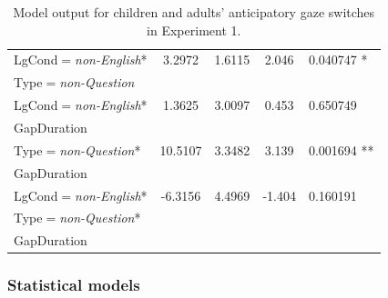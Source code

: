 \documentclass[authoryear, 12pt]{elsarticle}
\begin{document}
\begin{table}[h!]
\begin{small}
\begin{center}
\begin{tabular}{lcccl}
    LgCond$=$\textit{non-English}*			& 3.2972			& 1.6115		& 2.046	& 0.040747 * 	\\ 
    \hspace*{5mm} Type$=$\textit{non-Question} &&&& \\
    LgCond$=$\textit{non-English}*			& 1.3625			& 3.0097		& 0.453	& 0.650749     	\\
    \hspace*{5mm} GapDuration &&&& \\
    Type$=$\textit{non-Question}*				& 10.5107		& 3.3482		& 3.139	& 0.001694 ** 	\\
    \hspace*{5mm} GapDuration &&&& \\
    LgCond$=$\textit{non-English}*			& -6.3156		& 4.4969		& -1.404	& 0.160191 	\\    
    \hspace*{5mm} Type$=$\textit{non-Question}* &&&& \\
    \hspace*{5mm} GapDuration &&&& \\
    \hline
  \end{tabular}
\end{center}
  \end{small}
  \caption{Model output for children and adults' anticipatory gaze switches in Experiment 1.}
\label{tab:E1-models}
\end{table}
\linespread{2}



\subsubsection{Statistical models}
\label{sec:models1}
\end{document}
